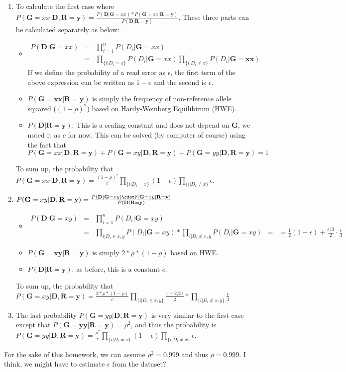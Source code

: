 \documentclass[]{article}
\begin{document}
\begin{enumerate}
\item To calculate the first case where $P(\mathbf{G}=xx | \mathbf{D,R=y}) = \frac{P(\mathbf{D|G}=xx)*P(\mathbf{G}=xx|\mathbf{R=y})}{P(\mathbf{D|R=y})}$.
These three parts can be calculated separately as below:
\begin{itemize}
\item
\begin{eqnarray*}
P(\mathbf{D|G}=xx) &=& \prod_{i=1}^n P(D_i|\mathbf{G}=xx)\\
&=& \prod_{\{i|D_i=x\}} P(D_i|\mathbf{G}=xx) \prod_{\{i|D_i\ne x\}} P(D_i|\mathbf{G=xx})
\end{eqnarray*}
If we define the probability of a read error as $\epsilon$, the first term of the above expression can be written as $1-\epsilon$ and the second is $\epsilon$.\
\item $P(\mathbf{G=xx|R=y})$ is simply the frequency of non-reference allele squared ($(1-\rho)^2$) based on Hardy-Weinberg Equilibirum (HWE).
\item $P(\mathbf{D|R=y})$: This is a scaling constant and does not depend on $\mathbf{G}$, we noted it as $c$ for now. This can be solved (by computer of course) using the fact that $P(\mathbf{G}=xx | \mathbf{D,R=y})+P(\mathbf{G}=xy | \mathbf{D,R=y})+P(\mathbf{G}=yy | \mathbf{D,R=y})=1$
\end{itemize}
To sum up, the probability that $P(\mathbf{G}=xx | \mathbf{D,R=y}) = \frac{(1-\rho)^2}{c}\prod_{\{i|D_i=x\}} (1-\epsilon) \prod_{\{i|D_i\ne x\}} \epsilon$.
\item $P(\mathbf{G}=xy | \mathbf{D,R=y}) = \frac{P(\mathbf{D|G}=xy)\cdotP(\mathbf{G}=xy|\mathbf{R=y})}{P(\mathbf{D|R=y})}$
\begin{itemize}
\item 
\begin{eqnarray*}
P(\mathbf{D|G}=xy) &=& \prod_{i=1}^n P(D_i|\mathbf{G}=xy)\\
&=& \prod_{i|D_i\in {x,y}} P(D_i|\mathbf{G}=xy) * \prod_{i|D_i\notin {x,y}} P(D_i|\mathbf{G}=xy)
&=& = \frac{1}{2}(1-\epsilon)+\frac{\epsilon/3}{2} \cdot \frac{\epsilon}{3}
\end{eqnarray*} 
\item $P(\mathbf{G=xy|R=y})$ is simply $2*\rho*(1-\rho)$ based on HWE.
\item $P(\mathbf{D|R=y})$: as before, this is a constant $c$.
\end{itemize}
To sum up, the probability that $P(\mathbf{G}=xy | \mathbf{D,R=y}) = \frac{2*\rho*(1-\rho)}{c} \prod_{\{i|D_i\in {x,y}\}}\frac{1-2/3\epsilon}{2} * \prod_{\{i|D_i\notin {x,y}\}} \frac{\epsilon}{3}$
\item The last probability $P(\mathbf{G}=yy | \mathbf{D,R=y})$ is very similar to the first case except that $P(\mathbf{G=yy|R=y}) = \rho^2$, and thus the probability is $P(\mathbf{G}=yy | \mathbf{D,R=y}) = \frac{\rho^2}{c}\prod_{\{i|D_i=x\}} (1-\epsilon) \prod_{\{i|D_i\ne x\}} \epsilon$. 
\end{enumerate}

For the sake of this homework, we can assume \(\rho^2=0.999\) and thus
\(\rho=0.999\). I think, we might have to estimate \(\epsilon\) from the
dataset?
\end{document}
